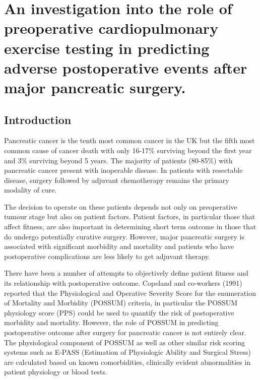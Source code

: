 
\chapter{An investigation into the role of preoperative cardiopulmonary exercise testing in predicting adverse postoperative events after major pancreatic surgery.}
 
\label{ch_cpet_outcomes}
 
\clearpage
 
\section{Introduction}
Pancreatic cancer is the tenth most common cancer in the UK but the fifth most common cause of cancer death with only 16-17\% surviving beyond the first year and 3\% surviving beyond 5 years. \parencite{cancerresearchuk_cancer_2014} The majority of patients (80-85\%) with pancreatic cancer present with inoperable disease.\parencite{cancerresearchuk_cancer_2014, sener_pancreatic_1999} In patients with resectable disease, surgery \parencite{sener_pancreatic_1999, sohn_resected_2000, geer_prognostic_1993} followed by adjuvant chemotherapy\parencite{neoptolemos_randomized_2004,neoptolemos_adjuvant_2009} remains the primary modality of cure.

The decision to operate on these patients depends not only on preoperative tumour stage but also on patient factors.\parencite{bilimoria_national_2007, sandroussi_sociodemographics_2010} Patient factors, in particular those that affect fitness, are also important in determining short term outcome in those that do undergo potentially curative surgery. \parencite{mann_review_2010, mayo_management_2012} However, major pancreatic surgery is associated with significant morbidity and mortality and patients who have postoperative complications are less likely to get adjuvant therapy.\parencite{teh_patient_2009}

There have been a number of attempts to objectively define patient fitness and its relationship with postoperative outcome. Copeland and co-workers (1991) reported that the Physiological and Operative Severity Score for the enumeration of Mortality and Morbidity (POSSUM) criteria, in particular the POSSUM physiology score (PPS) could be used to quantify the risk of postoperative morbidity and mortality.\parencite{copeland_possum:_1991} However, the role of POSSUM in predicting postoperative outcome after surgery for pancreatic cancer is not entirely clear.\parencite{de_castro_evaluation_2009, khan_evaluation_2003, kocher_risk-adjustment_2005, pratt_possum_2008, tamijmarane_application_2008} The physiological component of POSSUM as well as other similar risk scoring systems such as E-PASS (Estimation of Physiologic Ability and Surgical Stress)\parencite{haga_estimation_1999} are calculated based on known comorbidities, clinically evident abnormalities in patient physiology or blood tests.

